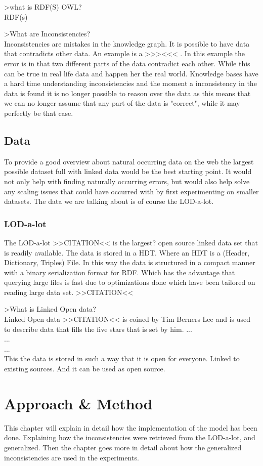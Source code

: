 \documentclass{article}
\begin{document}
>what is RDF(S) OWL?\\
RDF(s)

>What are Inconsistencies?\\
Inconsistencies are mistakes in the knowledge graph. It is possible to have data that contradicts other data. An example is a >>><<< . In this example the error is in that two different parts of the data contradict each other. While this can be true in real life data and happen her the real world. Knowledge bases have a hard time understanding inconsistencies and the moment a inconsistency in the data is found it is no longer possible to reason over the data as this means that we can no longer assume that any part of the data is "correct", while it may perfectly be that case.

\subsection{Data}
To provide a good overview about natural occurring data on the web the largest possible dataset full with linked data would be the best starting point. It would not only help with finding naturally occurring errors, but would also help solve any scaling issues that could have occurred with by first experimenting on smaller datasets. The data we are talking about is of course the LOD-a-lot.

\subsubsection{LOD-a-lot}
The LOD-a-lot >>CITATION<< is the largest? open source linked data set that is readily available. The data is stored in a HDT. Where an HDT is a (Header, Dictionary, Triples) File. In this way the data is structured in a compact manner with a binary serialization format for RDF. Which has the advantage that querying large files is fast due to optimizations done which have been tailored on reading large data set. >>CITATION<<

>What is Linked Open data?\\
Linked Open data >>CITATION<< is coined by Tim Berners Lee and is used to describe data that fills the five stars that is set by him. 
...\\
...\\
...\\
This the data is stored in such a way that it is open for everyone. Linked to existing sources. And it can be used as open source.

\newpage
\section{Approach \& Method}
This chapter will explain in detail how the implementation of the model has been done. Explaining how the inconsistencies were retrieved from the LOD-a-lot, and generalized. Then the chapter goes more in detail about how the generalized inconsistencies are used in the experiments. 
\end{document}
